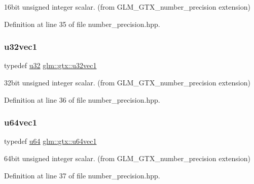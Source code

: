16bit unsigned integer scalar. (from G\+L\+M\+\_\+\+G\+T\+X\+\_\+number\+\_\+precision extension) 



Definition at line 35 of file number\+\_\+precision.\+hpp.

\mbox{\label{group__gtx__number__precision_gac46a7890b20928df83e734c3ea9557d4}} 
\subsubsection{\texorpdfstring{u32vec1}{u32vec1}}
{\footnotesize\ttfamily typedef \mbox{\hyperlink{group__gtc__type__precision_ga54e837745059fd29017bed71cfa0a8db}{u32}} \mbox{\hyperlink{group__gtx__number__precision_gac46a7890b20928df83e734c3ea9557d4}{glm\+::gtx\+::u32vec1}}}



32bit unsigned integer scalar. (from G\+L\+M\+\_\+\+G\+T\+X\+\_\+number\+\_\+precision extension) 



Definition at line 36 of file number\+\_\+precision.\+hpp.

\mbox{\label{group__gtx__number__precision_ga92812a1d7e746bcaba61d2f5a64afc52}} 
\subsubsection{\texorpdfstring{u64vec1}{u64vec1}}
{\footnotesize\ttfamily typedef \mbox{\hyperlink{group__gtc__type__precision_ga71cedd4972f9cb1a5e14dfe5ab83ecd7}{u64}} \mbox{\hyperlink{group__gtx__number__precision_ga92812a1d7e746bcaba61d2f5a64afc52}{glm\+::gtx\+::u64vec1}}}



64bit unsigned integer scalar. (from G\+L\+M\+\_\+\+G\+T\+X\+\_\+number\+\_\+precision extension) 



Definition at line 37 of file number\+\_\+precision.\+hpp.

\mbox{\label{group__gtx__number__precision_ga35ae7849593a354420e4f52d1b36c2d6}} 
